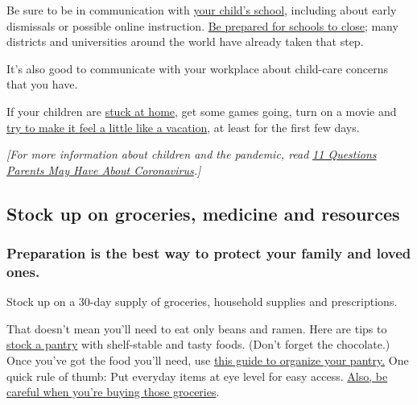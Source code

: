 Be sure to be in communication with
\href{https://parenting.nytimes3xbfgragh.onion/childrens-health/coronavirus-outbreak-schools}{your
child's school}, including about early dismissals or possible online
instruction.
\href{https://www.nytimes3xbfgragh.onion/interactive/2020/nyregion/school-closings-ny-nj.html}{Be
prepared for schools to close}; many districts and universities around
the world have already taken that step.

It's also good to communicate with your workplace about child-care
concerns that you have.

If your children are
\href{https://parenting.nytimes3xbfgragh.onion/preschooler/coronavirus-schools-lessons?module=latest-filters-feed\&action=click\&rank=3\&position=5}{stuck
at home}, get some games going, turn on a movie and
\href{https://parenting.nytimes3xbfgragh.onion/childrens-health/coronavirus-parents-need-to-know?module=latest-filters-feed\&action=click\&rank=5\&position=5}{try
to make it feel a little like a vacation}, at least for the first few
days.

\emph{{[}For more information about children and the pandemic, read}
\href{https://www.nytimes3xbfgragh.onion/2020/03/09/parenting/coronavirus-parents-need-to-know.html}{\emph{11
Questions Parents May Have About Coronavirus}}\emph{.{]}}

\hypertarget{stock-up-on-groceries-medicine-and-resources}{%
\subsection{Stock up on groceries, medicine and
resources}\label{stock-up-on-groceries-medicine-and-resources}}

\hypertarget{preparation-is-the-best-way-to-protect-your-family-and-loved-ones}{%
\subsubsection{\texorpdfstring{\textbf{Preparation is the best way to
protect your family and loved
ones.}}{Preparation is the best way to protect your family and loved ones.}}\label{preparation-is-the-best-way-to-protect-your-family-and-loved-ones}}

Stock up on a 30-day supply of groceries, household supplies and
prescriptions.

That doesn't mean you'll need to eat only beans and ramen. Here are tips
to
\href{https://www.nytimes3xbfgragh.onion/2020/03/06/dining/how-to-stock-a-pantry.html}{stock
a pantry} with shelf-stable and tasty foods. (Don't forget the
chocolate.) Once you've got the food you'll need, use
\href{https://www.nytimes3xbfgragh.onion/2020/04/06/realestate/virus-organize-pantry-tips.html}{this
guide to organize your pantry.} One quick rule of thumb: Put everyday
items at eye level for easy access.
\href{https://www.nytimes3xbfgragh.onion/2020/03/26/well/eat/coronavirus-shopping-food-groceries-infection.html}{Also,
be careful when you're buying those groceries}.


